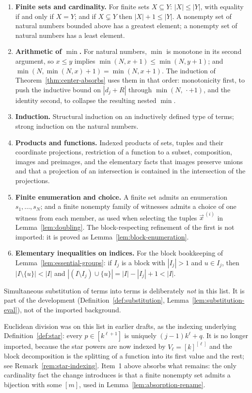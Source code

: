 \documentclass[11pt]{article}
\theoremstyle{mainplain}
\theoremstyle{mainroman}
\theoremstyle{definition}
\numberwithin{equation}{section}
\begin{document}
\begin{enumerate}
\item \textbf{Finite sets and cardinality.} For finite sets $X\subseteq Y$:
      $|X|\le|Y|$, with equality if and only if $X=Y$; and if
      $X\subsetneq Y$ then $|X|+1\le|Y|$. A nonempty set of natural numbers
      bounded above has a greatest element; a nonempty set of natural numbers
      has a least element.
\item \textbf{Arithmetic of $\min$.} For natural numbers, $\min$ is monotone
      in its second argument, so $x\le y$ implies
      $\min(N,x+1)\le\min(N,y+1)$; and
      $\min(N,\min(N,x)+1)=\min(N,x+1)$. The induction of
      Theorem~\ref{thm:center-absorbs} uses them in that order: monotonicity
      first, to push the inductive bound on $|d_j+R|$ through
      $\min(N,\,\cdot+1)$, and the identity second, to collapse the resulting
      nested $\min$.
\item \textbf{Induction.} Structural induction on an inductively defined type
      of terms; strong induction on the natural numbers.
\item \textbf{Products and functions.} Indexed products of sets, tuples and
      their coordinate projections, restriction of a function to a subset,
      composition, images and preimages, and the elementary facts that images
      preserve unions and that a projection of an intersection is contained in
      the intersection of the projections.
\item \textbf{Finite enumeration and choice.} A finite set admits an
      enumeration $s_1,\dots,s_N$; and a finite nonempty family of witnesses
      admits a choice of one witness from each member, as used when selecting
      the tuples $\vec x^{\,(i)}$ in Lemma~\ref{lem:doubling}. The
      block-respecting refinement of the first is not imported: it is proved
      as Lemma~\ref{lem:block-enumeration}.
\item \textbf{Elementary inequalities on indices.} For the block bookkeeping of
      Lemma~\ref{lem:essential-groups}: if $I_j$ is a block with $|I_j|>1$ and
      $u\in I_j$, then $|I\setminus\{u\}|<|I|$ and
      $|(I\setminus I_j)\cup\{u\}|=|I|-|I_j|+1<|I|$.
\end{enumerate}

Simultaneous substitution of terms into terms is deliberately \emph{not} in
this list. It is part of the development (Definition~\ref{def:substitution},
Lemma~\ref{lem:substitution-eval}), not of the imported background.

Euclidean division was on this list in earlier drafts, as the indexing
underlying Definition~\ref{def:star}: every $p\in[k^{\ell+1}]$ is uniquely
$(j-1)k^{\ell}+q$. It is no longer imported, because the star powers are now
indexed by $V_{\ell}=[k]^{[\ell]}$ and the block decomposition is the splitting
of a function into its first value and the rest; see
Remark~\ref{rem:star-indexing}. Item~1 above absorbs what remains: the only
cardinality fact the change introduces is that a finite nonempty set admits a
bijection with some $[m]$, used in Lemma~\ref{lem:absorption-rename}.
\end{document}
